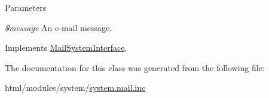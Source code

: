 \begin{DoxyParams}{Parameters}
\item[{\em \$message}]An e-\/mail message. \end{DoxyParams}


Implements \hyperlink{interfaceMailSystemInterface_a8dd560f7879b93d1fd3497b27a3b08f7}{MailSystemInterface}.

The documentation for this class was generated from the following file:\begin{DoxyCompactItemize}
\item 
html/modules/system/\hyperlink{system_8mail_8inc}{system.mail.inc}\end{DoxyCompactItemize}
